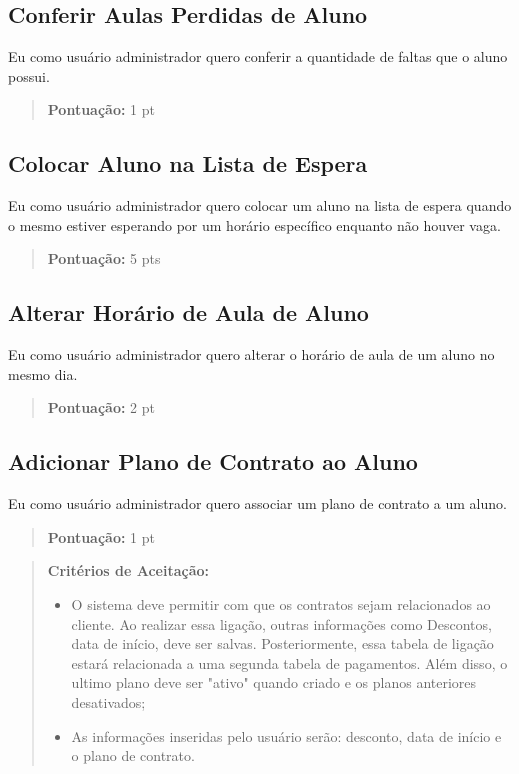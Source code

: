\subsection[Conferir Aulas Perdidas de Aluno]{Conferir Aulas Perdidas de Aluno}
Eu como usuário administrador quero conferir a quantidade de faltas que o aluno
possui.
\begin{quote}
    \textbf{Pontuação:} 1 pt
\end{quote}

\subsection[Colocar Aluno na Lista de Espera]{Colocar Aluno na Lista de Espera}
Eu como usuário administrador quero colocar um aluno na lista de espera quando o
mesmo estiver esperando por um horário específico enquanto não houver vaga.
\begin{quote}
    \textbf{Pontuação:} 5 pts
\end{quote}

\subsection[Alterar Horário de Aula de Aluno]{Alterar Horário de Aula de Aluno}
Eu como usuário administrador quero alterar o horário de aula de um aluno no
mesmo dia.
\begin{quote}
    \textbf{Pontuação:} 2 pt
\end{quote}

\subsection[Adicionar Plano de Contrato ao Aluno]{Adicionar Plano de Contrato ao Aluno}
Eu como usuário administrador quero associar um plano de contrato a um aluno.
\begin{quote}
    \textbf{Pontuação:} 1 pt
\end{quote}
\begin{quote}
\textbf{Critérios de Aceitação:}
    \begin{itemize}
        \item O sistema deve permitir com que os contratos sejam relacionados ao cliente. Ao realizar essa ligação, outras informações como Descontos, data de início, deve ser salvas. Posteriormente, essa tabela de ligação estará relacionada a uma segunda tabela de pagamentos. Além disso, o ultimo plano deve ser "ativo" quando criado e os planos anteriores desativados;
        \item As informações inseridas pelo usuário serão: desconto, data de início e o plano de contrato.
    \end{itemize}
\end{quote}

